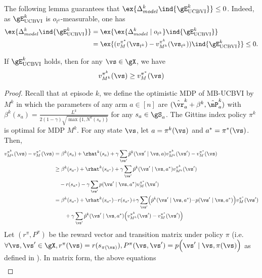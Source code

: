 \begin{subappendices}
The following lemma guarantees that $\ex{\Delta_{model}^k \ind{\gE^{k}_\text{UCBVI}}}\le0$. Indeed, as $\gE^{k}_\text{UCBVI}$ is $o_{t^k}$-measurable, one has 
\begin{align*}
    \ex{\Delta_{model}^k\ind{\gE^{k}_\text{UCBVI}}} &= \ex{\ex{\Delta_{model}^k\mid o_{t^k}}\ind{\gE^{k}_\text{UCBVI}}}\\
    &=\ex{(v_M^{\pi^*}(\vs_{t^k}) - v_{M^k}^{\pi^k}(\vs_{t^k}))\ind{\gE^{k}_\text{UCBVI}}} \le 0.
\end{align*}
\begin{lem}
    \label{lem:ucbvi_optim}
   If $\gE^{k}_\textnormal{UCBVI}$ holds, then for any $\vs\in\gX$, we have
   \begin{align*}
       v_{M^k}^{\pi^k}(\vs) \ge v_{M}^{\pi^*}(\vs)
    \end{align*}
\end{lem}
\begin{proof}
    Recall that at episode $k$, we define the optimistic MDP of MB-UCBVI by $M^k$ in which the parameters of any arm $a\in[n]$ are $(\hat{\vr}^{k}_a +\beta^{k}, \hat{\mP}^{k}_a)$ with $\beta^k(s_a){=}\frac{L^{k}}{2(1-\gamma)\sqrt{\max\{1,N^{k}(s_a)\} }}$ for any $s_a\in\gS_a$.
The Gittins index policy $\pi^k$ is optimal for MDP $M^k$.
For any state $\vs$, let $a=\pi^k(\vs)$ and $a^*=\pi^*(\vs)$.
Then,
\begin{align*}
    v_{M^k}^{\pi^k}(\vs) -v_M^{\pi^*}(\vs)
    &= \beta^k(s_a) +\rhat^{k}(s_a) +\gamma\sum_{\vs'}\hat{p}^{k}(\vs'\mid \vs,a)v_{M^k}^{\pi^k}(\vs') -v_M^{\pi^*}(\vs)\\ 
    &\ge \beta^{k}(s_{a^*}) +\rhat^{k}(s_{a^*}) +\gamma\sum_{\vs'}\hat{p}^{k}(\vs'\mid \vs,a^*)v_{M^k}^{\pi^k}(\vs') \\
    &\quad -r(s_{a^*}) -\gamma\sum_{\vs'}p(\vs'\mid \vs,a^*)v_M^{\pi^*}(\vs') \\
    &= \beta^{k}(s_{a^*}) +\rhat^{k}(s_{a^*}) {-}r(s_{a^*}) {+}\gamma\sum_{\vs'}\Bigl(\hat{p}^{k}(\vs'\mid \vs,a^*) {-}p(\vs'\mid \vs,a^*)\Bigr)v_M^{\pi^*}(\vs') \\
    &\qquad +\gamma \sum_{\vs'}\hat{p}^{k}(\vs'\mid \vs,a^*)\Bigl(v_{M^k}^{\pi^k}(\vs') -v_M^{\pi^*}(\vs')\Bigr)
\end{align*}
Let $(r^{\pi}, P^{\pi})$ be the reward vector and transition matrix under policy $\pi$ (i.e. $\forall \vs, \vs'\in\gX, r^{\pi}(\vs)=r(s_{\pi(\vs)}), P^{\pi}(\vs,\vs')=p\Bigl( \vs'\mid \vs,\pi(\vs)\Bigr)$ as defined in ).
In matrix form, the above equations
\begin{align*}

\end{align*}
\end{proof}
\end{subappendices}
